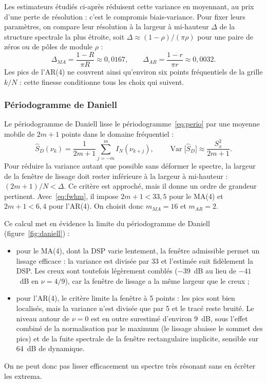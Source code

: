 \documentclass[11pt,a4paper]{article}
\begin{document}
Les estimateurs étudiés ci-après réduisent cette variance en moyennant, au prix d'une perte de résolution : c'est le compromis biais-variance. Pour fixer leurs paramètres, on compare leur résolution à la largeur à mi-hauteur $\Delta$ de la structure spectrale la plus étroite, soit $\Delta \approx (1-\rho)/(\pi\rho)$ pour une paire de zéros ou de pôles de module $\rho$ :
\begin{equation}
  \Delta_{MA} = \frac{1-R}{\pi R} \approx 0{,}0167,
  \qquad
  \Delta_{AR} = \frac{1-r}{\pi r} \approx 0{,}0032.
  \label{eq:fwhm}
\end{equation}
Les pics de l'AR(4) ne couvrent ainsi qu'environ six points fréquentiels de la grille $k/N$ : cette finesse conditionne tous les choix qui suivent.

\subsubsection{Périodogramme de Daniell}

Le périodogramme de Daniell lisse le périodogramme~\eqref{eq:perio} par une moyenne mobile de $2m+1$ points dans le domaine fréquentiel :
\begin{equation}
  \hat{S}_{D}(\nu_k) = \frac{1}{2m + 1} \sum_{j = -m}^{m} I_N(\nu_{k + j}),
  \qquad
  \operatorname{Var}\big[\hat{S}_{D}\big] \approx \frac{S_x^2}{2m+1}.
  \label{eq:daniell}
\end{equation}
Pour réduire la variance autant que possible sans déformer le spectre, la largeur de la fenêtre de lissage doit rester inférieure à la largeur à mi-hauteur : $(2m+1)/N < \Delta$. Ce critère est approché, mais il donne un ordre de grandeur pertinent. Avec~\eqref{eq:fwhm}, il impose $2m+1 < 33{,}5$ pour le MA(4) et $2m+1 < 6{,}4$ pour l'AR(4). On choisit donc $m_{MA} = 16$ et $m_{AR} = 2$.

Ce calcul met en évidence la limite du périodogramme de Daniell (figure~\ref{fig:daniell}) :
\begin{itemize}
  \item pour le MA(4), dont la DSP varie lentement, la fenêtre admissible permet un lissage efficace : la variance est divisée par 33 et l'estimée suit fidèlement la DSP. Les creux sont toutefois légèrement comblés ($-39$~dB au lieu de $-41$~dB en $\nu = 4/9$), car la fenêtre de lissage a la même largeur que le creux ;
  \item pour l'AR(4), le critère limite la fenêtre à 5 points : les pics sont bien localisés, mais la variance n'est divisée que par 5 et le tracé reste bruité. Le niveau autour de $\nu = 0$ est en outre surestimé d'environ $9$~dB, sous l'effet combiné de la normalisation par le maximum (le lissage abaisse le sommet des pics) et de la fuite spectrale de la fenêtre rectangulaire implicite, sensible sur 64~dB de dynamique.
\end{itemize}
On ne peut donc pas lisser efficacement un spectre très résonant sans en écrêter les extrema.
\end{document}
